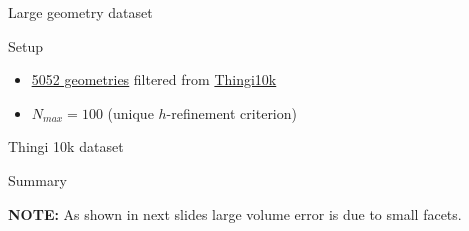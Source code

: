 \documentclass{beamer}
\begin{document}
\begin{frame}{Large geometry dataset}
  \begin{block}{Setup}
    \begin{itemize}
      \item
  
        \href{https://ten-thousand-models.appspot.com/results.html?q=is+closed\%2C+is+oriented\%2C+is+manifold\%2C+is+not+degenerate\%2C+without+self-intersection\%2C+\%23df\%3D0}{\underline{5052 geometries}}
        filtered from \href{https://ten-thousand-models.appspot.com}{Thingi10k}

        
      \item
        $N_{max} = 100 $ (unique $h$-refinement criterion)
    \end{itemize}

  \end{block}


\end{frame}
\begin{frame}{Thingi 10k dataset}
  \begin{block}{Summary}

  \end{block}

  \vfill{}

  \textbf{NOTE:} As shown in next slides large volume error is due to small facets.

%
%
%
%
%
%
%
%
%
%
%

\end{frame}
\end{document}
